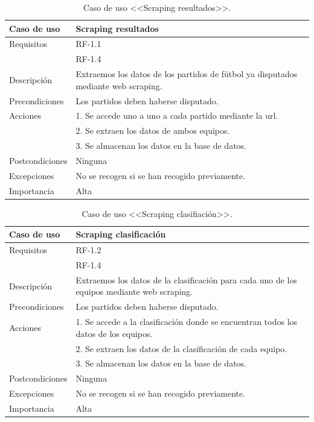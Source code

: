  \begin{table}
  \begin{center}
   \begin{tabular}{|p{3cm} | p{9cm} |}
    \hline
    Caso de uso & Scraping resultados\\
    \hline
    Requisitos & RF-1.1\\
    & RF-1.4\\
    \hline
    Descripción & Extraemos los datos de los partidos de fútbol ya disputados mediante web scraping.\\
    \hline
    Precondiciones &Los partidos deben haberse disputado.\\
    \hline
    Acciones & 1. Se accede uno a uno a cada partido mediante la url. \\
    &2. Se extraen los datos de ambos equipos.\\
    &3. Se almacenan los datos en la base de datos.\\
    \hline
    Postcondiciones & Ninguna \\
    \hline
    Excepciones & No se recogen si se han recogido previamente.\\
    \hline
    Importancia & Alta \\
    \hline
   \end{tabular}
   \caption{Caso de uso <<Scraping resultados>>.}
   \label{tabla:casoUso1.1}
  \end{center}
 \end{table} 
 
\begin{table}
  \begin{center}
   \begin{tabular}{|p{3cm} | p{9cm} |}
    \hline
    Caso de uso & Scraping clasificación\\
    \hline
    Requisitos & RF-1.2\\
    & RF-1.4\\
    \hline
    Descripción & Extraemos los datos de la clasificación para cada uno de los equipos mediante web scraping.\\
    \hline
    Precondiciones &Los partidos deben haberse disputado.\\
    \hline
  	Acciones & 1. Se accede a la clasificación donde se encuentran todos los datos de los equipos. \\
    &2. Se extraen los datos de la clasificación de cada equipo.\\
    &3. Se almacenan los datos en la base de datos.\\
    \hline
    Postcondiciones & Ninguna \\
    \hline
    Excepciones & No se recogen si se han recogido previamente.\\
    \hline
    Importancia & Alta \\
    \hline
   \end{tabular}
   \caption{Caso de uso <<Scraping clasifiación>>.}
   \label{tabla:casoUso1.2}
  \end{center}
 \end{table} 

